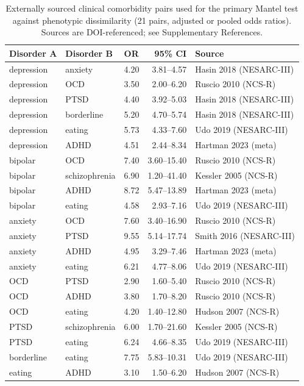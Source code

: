 \documentclass[11pt]{article}
\begin{document}
\begin{table}[h]\centering\small
\caption{Externally sourced clinical comorbidity pairs used for the primary Mantel test against
phenotypic dissimilarity (21 pairs, adjusted or pooled odds ratios). Sources are DOI-referenced;
see Supplementary References.}
\label{tab:st4}
\begin{tabular}{lllrl}
\toprule
Disorder A & Disorder B & OR & 95\% CI & Source \\
\midrule
depression & anxiety & 4.20 & 3.81--4.57 & Hasin 2018 (NESARC-III) \\
depression & OCD & 3.50 & 2.00--6.20 & Ruscio 2010 (NCS-R) \\
depression & PTSD & 4.40 & 3.92--5.03 & Hasin 2018 (NESARC-III) \\
depression & borderline & 5.20 & 4.70--5.74 & Hasin 2018 (NESARC-III) \\
depression & eating & 5.73 & 4.33--7.60 & Udo 2019 (NESARC-III) \\
depression & ADHD & 4.51 & 2.44--8.34 & Hartman 2023 (meta) \\
bipolar & OCD & 7.40 & 3.60--15.40 & Ruscio 2010 (NCS-R) \\
bipolar & schizophrenia & 6.90 & 1.20--41.40 & Kessler 2005 (NCS-R) \\
bipolar & ADHD & 8.72 & 5.47--13.89 & Hartman 2023 (meta) \\
bipolar & eating & 4.58 & 2.93--7.16 & Udo 2019 (NESARC-III) \\
anxiety & OCD & 7.60 & 3.40--16.90 & Ruscio 2010 (NCS-R) \\
anxiety & PTSD & 9.55 & 5.14--17.74 & Smith 2016 (NESARC-III) \\
anxiety & ADHD & 4.95 & 3.29--7.46 & Hartman 2023 (meta) \\
anxiety & eating & 6.21 & 4.77--8.06 & Udo 2019 (NESARC-III) \\
OCD & PTSD & 2.90 & 1.60--5.40 & Ruscio 2010 (NCS-R) \\
OCD & ADHD & 3.80 & 1.70--8.20 & Ruscio 2010 (NCS-R) \\
OCD & eating & 4.20 & 1.40--12.80 & Hudson 2007 (NCS-R) \\
PTSD & schizophrenia & 6.00 & 1.70--21.60 & Kessler 2005 (NCS-R) \\
PTSD & eating & 6.24 & 4.66--8.35 & Udo 2019 (NESARC-III) \\
borderline & eating & 7.75 & 5.83--10.31 & Udo 2019 (NESARC-III) \\
eating & ADHD & 3.10 & 1.50--6.20 & Hudson 2007 (NCS-R) \\
\bottomrule
\end{tabular}
\end{table}
\end{document}
